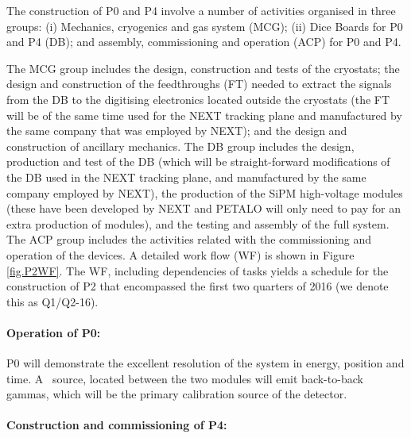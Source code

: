 The construction of P0 and P4 involve a number of activities  organised in three groups: (i) Mechanics, cryogenics and gas system (MCG);  (ii) Dice Boards for P0 and P4 (DB);  and assembly, commissioning and operation (ACP) for P0 and P4. 

The MCG group includes the design, construction and tests of the cryostats; the design and construction of the feedthroughs (FT) needed to extract the signals from the DB to the digitising electronics located outside the cryostats (the FT will be of the same time used for the NEXT tracking plane and manufactured by the same company that was employed by NEXT);  and the design and construction of ancillary mechanics. The DB group includes the design, production and test of the DB (which will be straight-forward modifications of the DB used in the NEXT tracking plane, and manufactured by the same company employed by NEXT), the production of the SiPM high-voltage modules (these have been developed by NEXT and PETALO will only need to pay for an extra production of modules), and the testing and assembly of the full system. The ACP group includes the activities related with the commissioning and operation of the devices. A detailed work flow (WF) is shown in Figure \ref{fig.P2WF}. The WF, including dependencies of tasks yields a schedule for the construction of P2 that encompassed the first two quarters of 2016 (we denote this as Q1/Q2-16). 

\paragraph{Operation of P0:}


P0 will demonstrate the excellent resolution of the system in energy, position and time. A \NA\ source, located between the two modules will emit back-to-back gammas, which will be the primary calibration source of the detector. 

\paragraph{Construction and commissioning of P4:}
%

